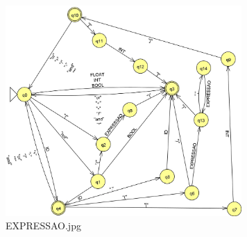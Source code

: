 \begin{figure}[H]
\centering
\includegraphics[width=9cm,keepaspectratio]{jflap-automatas/EXPRESSAO.jpg}
\caption{\label{fig:expressao-jflap} EXPRESSAO.jpg}
\end{figure}